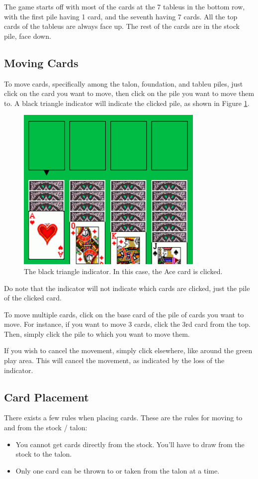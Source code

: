 \documentclass[12pt,a4paper,titlepage]{article}
\begin{document}
	The game starts off with most of the cards at the 7 tableus in the bottom
	row, with the first pile having 1 card, and the seventh having 7 cards. All
	the top cards of the tableus are always face up. The rest of the cards are
	in the stock pile, face down.

	\subsection{Moving Cards}
	To move cards, specifically among the talon, foundation, and tableu piles,
	just click on the card you want to move, then click on the pile you want to
	move them to. A black triangle indicator will indicate the clicked pile, as
	shown in Figure \ref{fig:fig2}.

	\begin{figure}[H]
		\centering
		\captionsetup{justification=centering}
		\includegraphics[width=9cm]{images/fig2.png}
		\caption{The black triangle indicator. In this case, the Ace card is
		clicked.}
		\label{fig:fig2}
	\end{figure}
	
	Do note that the indicator will not indicate which cards are clicked, just
	the pile of the clicked card.

	To move multiple cards, click on the base card of the pile of cards you want
	to move. For instance, if you want to move 3 cards, click the 3rd card from
	the top. Then, simply click the pile to which you want to move them.

	If you wish to cancel the movement, simply click elsewhere, like around the
	green play area. This will cancel the movement, as indicated by the loss of
	the indicator.

	\subsection{Card Placement}
	There exists a few rules when placing cards. These are the rules for moving
	to and from the stock / talon:
	\begin{itemize}
		\item You cannot get cards directly from the stock. You'll have to draw
		from the stock to the talon.
		\item Only one card can be thrown to or taken from the talon at a time.
	\end{itemize}
\end{document}
